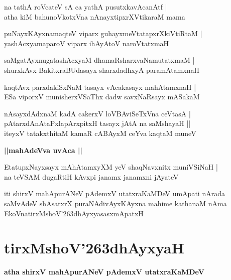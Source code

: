 \documentclass[twoside,12pt,openright]{book}
\def\S{\char'263}
\newcounter{shloka}[chapter]
\def\uvaca#1{\centerline{{\large\textbf{#1}}}}
\begin{document}
\begin{shloka}%
na tathA roVcateV sA ca yathA pusutxkavAcanAtf |\\
atha kiM bahunoVkotxVna nAnayxtipxrXVtikaraM mama
\end{shloka}

\begin{shloka}%
puNayxKAyxnamaqteV viparx guhayxmeVtatapxrXkiVtiRtaM |\\
yashAcxyamaparoV viparx ihAyAtoV naroVtatxmaH 
\end{shloka}

\begin{shloka}%
saMgatAyxnugatashAcxyaM dhamaRsharxvaNamutatxmaM |\\
shurxkAvx BakitxraBUdasayx sharxdadhxyA paramAtamxnaH 
\end{shloka}

\begin{shloka}%
kaqtAvx parxdakiSxNaM tasayx vAcakasayx mahAtamxnaH |\\
ESa viporxV munisherxVSaThx dadw savxNaRsayx mASakaM 
\end{shloka}

\begin{shloka}%
nAsayxdAdxnaM kadA cakerxV loVBAviSeTxVna ceVtasA |\\
pAtarxdAnAtaPxlapArxpitxH tasayx jAtA na saMshayaH ||\\
iteyxV tatakxthitaM kamaR cABAyxM ceYva kaqtaM muneV 
\end{shloka}

\uvaca{||mahAdeVva uvAca ||}

\begin{shloka}%
EtatupxNayxsayx mAhAtamxyXM yeV shaqNavxnitx muniVSiNaH |\\
na teVSAM dugaRtiH kAvxpi janamx janamxni jAyateV
\end{shloka}

\begin{center}
iti shirxV mahApurANeV pAdemxV utatxraKaMDeV umApati nArada saMvAdeV  
shAsatxrX puraNAdivAyxKAyxna mahime kathanaM nAma EkoVnatirxMshoV\S dhAyxyasasxmApatxH
\end{center}

\chapter{tirxMshoV\S dhAyxyaH}

\begin{center}
{\LARGE\bfseries atha shirxV mahApurANeV pAdemxV utatxraKaMDeV}
\end{center}
\end{document}

